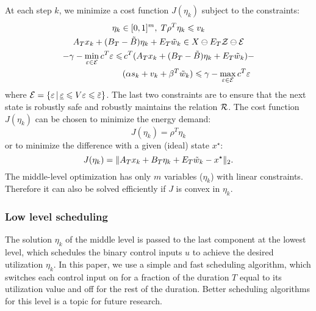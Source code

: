 At each step $k$, we minimize a cost function $J(\eta_{k})$ subject to the constraints:
\begin{gather*}
  \eta_{k} \in [0,1]^{m}, \; T \rho^{T} \eta_{k} \leqslant v_{k} \\
  A_{T} x_{k} + (B_{T} - \tilde{B}) \eta_{k} + E_{T} \tilde{w}_{k} \in X \ominus E_{T} \ZSet \ominus \ESet \\
  \begin{aligned}
    -\gamma - \min_{\varepsilon \in \ESet} c^{T} \varepsilon %
    \leqslant & \, c^{T}(A_{T} x_{k} + (B_{T} - \tilde{B}) \eta_{k}
    + %
    E_{T} \tilde{w}_{k}) - \\
    & (\alpha s_{k} + v_{k} + \beta^{T} \tilde{w}_{k}) \leqslant \gamma
    - \max_{\varepsilon \in \ESet} c^{T}
    \varepsilon %
  \end{aligned}
\end{gather*}
where $\ESet = \{\varepsilon \,|\, \underline{\varepsilon} \leqslant V \varepsilon \leqslant \overbar{\varepsilon}\}$.
The last two constraints are to ensure that the next state is robustly safe and robustly maintains the relation $\mathcal{R}$.
The cost function $J(\eta_{k})$ can be chosen to minimize the energy demand:
\begin{equation*}
  J(\eta_{k}) = \rho^{T} \eta_{k}
\end{equation*}
or to minimize the difference with a given (ideal) state $x^{\star}$:
\begin{equation*}
  J(\eta_{k}) = \| A_{T} x_{k} + B_{T} \eta_{k} + E_{T} \tilde{w}_{k} - x^{\star} \|_{2} \text.
\end{equation*}
%
The middle-level optimization has only $m$ variables ($\eta_{k}$) with linear constraints.
Therefore it can also be solved efficiently if $J$ is convex in $\eta_{k}$.

\subsubsection{Low level scheduling}

The solution $\eta_{k}$ of the middle level is passed to the last component at the lowest level, which schedules the binary control inputs $u$ to achieve the desired utilization $\eta_{k}$.
In this paper, we use a simple and fast scheduling algorithm, which switches each control input on for a fraction of the duration $T$ equal to its utilization value and off for the rest of the duration.
Better scheduling algorithms for this level is a topic for future research.

